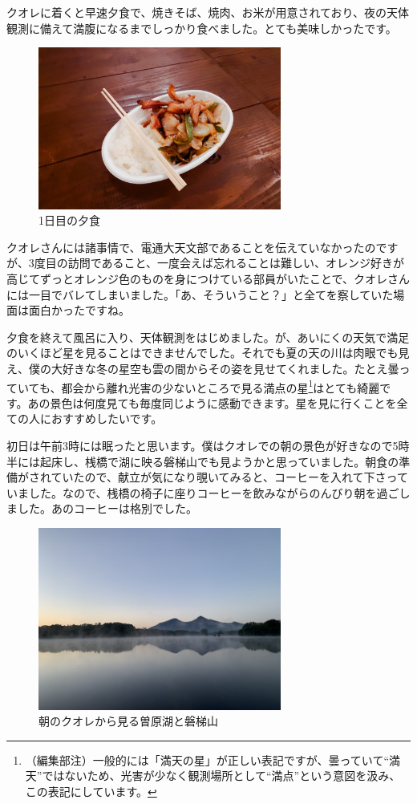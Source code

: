 \documentclass[../main]{subfiles}
\begin{document}
クオレに着くと早速夕食で、焼きそば、焼肉、お米が用意されており、夜の天体観測に備えて満腹になるまでしっかり食べました。とても美味しかったです。
\begin{figure}[H]
\includegraphics[width=8cm]{sections/Nakahara/IMG_8502.jpg}
\centering
\caption{1日目の夕食}
\end{figure}

クオレさんには諸事情で、電通大天文部であることを伝えていなかったのですが、3度目の訪問であること、一度会えば忘れることは難しい、オレンジ好きが高じてずっとオレンジ色のものを身につけている部員がいたことで、クオレさんには一目でバレてしまいました。「あ、そういうこと？」と全てを察していた場面は面白かったですね。

夕食を終えて風呂に入り、天体観測をはじめました。が、あいにくの天気で満足のいくほど星を見ることはできませんでした。それでも夏の天の川は肉眼でも見え、僕の大好きな冬の星空も雲の間からその姿を見せてくれました。たとえ曇っていても、都会から離れ光害の少ないところで見る満点の星\footnote{（編集部注）一般的には「満天の星」が正しい表記ですが、曇っていて``満天''ではないため、光害が少なく観測場所として``満点''という意図を汲み、この表記にしています。}はとても綺麗です。あの景色は何度見ても毎度同じように感動できます。星を見に行くことを全ての人におすすめしたいです。

初日は午前3時には眠ったと思います。僕はクオレでの朝の景色が好きなので5時半には起床し、桟橋で湖に映る磐梯山でも見ようかと思っていました。朝食の準備がされていたので、献立が気になり覗いてみると、コーヒーを入れて下さっていました。なので、桟橋の椅子に座りコーヒーを飲みながらのんびり朝を過ごしました。あのコーヒーは格別でした。

\begin{figure}[H]
\centering
\includegraphics[width=8cm]{sections/Nakahara/IMG_2643.jpeg}
\caption{朝のクオレから見る曽原湖と磐梯山}
\centering
\end{figure}
\end{document}
